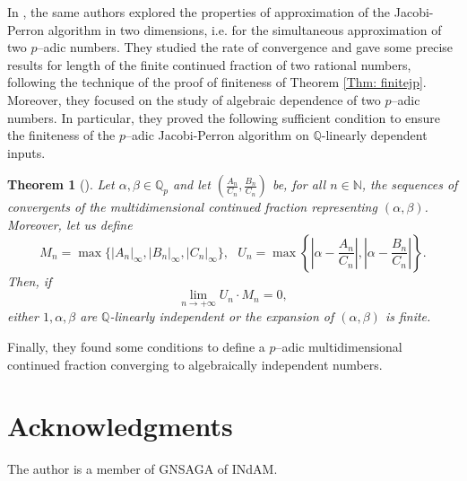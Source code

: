 \documentclass[12pt, reqno]{amsart}
\theoremstyle{plain}
\newtheorem{Theorem}{Theorem}
\theoremstyle{definition}
\begin{document}
In \cite{MT3}, the same authors explored the properties of approximation of the Jacobi-Perron algorithm in two dimensions, i.e. for the simultaneous approximation of two $p$--adic numbers. They studied the rate of convergence and gave some precise results for length of the finite continued fraction of two rational numbers, following the technique of the proof of finiteness of Theorem \ref{Thm: finitejp}. Moreover, they focused on the study of algebraic dependence of two $p$--adic numbers. In particular, they proved the following sufficient condition to ensure the finiteness of the $p$--adic Jacobi-Perron algorithm on $\mathbb{Q}$-linearly dependent inputs.
\begin{Theorem}[\cite{MT3}]
Let $\alpha,\beta\in\mathbb{Q}_p$ and let $\left(\frac{A_n}{C_n},\frac{B_n}{C_n}\right)$ be, for all $n\in\mathbb{N}$, the sequences of convergents of the multidimensional continued fraction representing $(\alpha,\beta)$. Moreover, let us define
\[M_n=\max\{|A_n|_{\infty},|B_n|_{\infty},|C_n|_{\infty}\}, \ \ \ U_n=\max\left\{\left|\alpha-\frac{A_n}{C_n}\right|,\left|\alpha-\frac{B_n}{C_n}\right|\right\}.\]
Then, if
\[\lim\limits_{n\rightarrow +\infty}U_n\cdot M_n=0,\]
either $1,\alpha,\beta$ are $\mathbb{Q}$-linearly independent or the expansion of $(\alpha,\beta)$ is finite.
\end{Theorem}
Finally, they found some conditions to define a $p$--adic multidimensional continued fraction converging to algebraically independent numbers.

\section*{Acknowledgments}
The author is a member of GNSAGA of INdAM.
\end{document}
